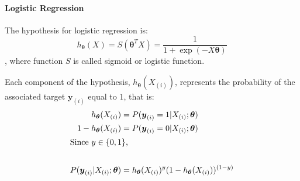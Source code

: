 \documentclass{article}
\renewcommand{\pmb}[1]{\boldsymbol{#1}}
\begin{document}
\paragraph{Logistic Regression}
The hypothesis for logistic regression is:
$$h_{\pmb{\theta}}(X) = S(\pmb\theta^T X) = \frac{1}{1+\exp{(-X\pmb\theta)}}$$, where function $S$ is called sigmoid or logistic function. \newline

Each component of the hypothesis, $h_{\pmb{\theta}}(X_{(i)})$, represents the probability of the associated target $\pmb{y}_{(i)}$ equal to $1$, that is:
\begin{align*}
    h_{\pmb{\theta}}(X_{(i)}) &= P(\pmb{y}_{(i)} = 1 | X_{(i)} ; \pmb\theta) \\ 
    1 - h_{\pmb{\theta}}(X_{(i)}) &= P(\pmb{y}_{(i)} = 0 | X_{(i)} ; \pmb\theta) \\ 
    \intertext{Since $y \in \{ 0, 1 \}$, } \\ 
    P(\pmb{y}_{(i)} | X_{(i)} ; \pmb\theta) &= h_{\pmb{\theta}} (X_{(i)})^{y} (1 - h_{\pmb{\theta}}(X_{(i)}))^{(1-y)}
\end{align*}
\end{document}

